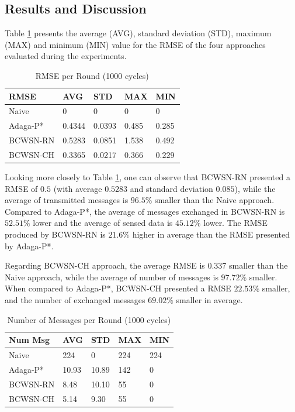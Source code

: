 \documentclass[conference]{IEEEtran}
\begin{document}
\subsection{Results and Discussion}
\label{results-and-discussion}


Table \ref{tab:rmse} presents the average (AVG), standard deviation (STD),
maximum (MAX) and minimum (MIN) value for the RMSE of the four approaches
evaluated during the experiments.

\begin{table}[h!]
\caption{RMSE per Round (1000 cycles)}
\label{tab:rmse}
\begin{center}
\begin{tabular}{|l||l|l|l|l|}
\hline
RMSE &AVG &STD &MAX &MIN \\
\hline\hline
Naive &0 &0 &0 &0 \\
\hline
Adaga-P* &0.4344 &0.0393 &0.485 &0.285 \\
\hline
BCWSN-RN &0.5283 &0.0851 &1.538 &0.492 \\
\hline
BCWSN-CH &0.3365 &0.0217 &0.366 &0.229 \\
\hline
\end{tabular}
\end{center}
\end{table}

Looking more closely to Table \ref{tab:rmse}, one can observe that BCWSN-RN
presented a RMSE of $0.5$ (with average $0.5283$ and standard deviation $0.085$),
while the average of transmitted messages  is $96.5\%$ smaller than the Naive
approach. Compared to Adaga-P*, the average of messages exchanged in BCWSN-RN is
 $52.51\%$ lower and the average of sensed data is $45.12\%$ lower. The RMSE
produced by BCWSN-RN is $21.6\%$ higher in average than the RMSE presented by
Adaga-P*.


Regarding BCWSN-CH approach, the average RMSE is $0.337$ smaller than the Naive
approach, while the average of number of messages is $97.72\%$ smaller. When
compared to Adaga-P*, BCWSN-CH presented a RMSE $22.53\%$ smaller, and the
number of exchanged messages $69.02\%$ smaller in average.

\begin{table}[h!]
\caption{Number of Messages per Round (1000 cycles)}
\label{tab:num-msg}
\begin{center}
\begin{tabular}{|l||l|l|l|l|}
\hline
Num Msg &AVG &STD &MAX &MIN \\
\hline\hline
Naive &224 &0 &224 &224 \\
\hline
Adaga-P* &10.93 &10.89 &142 &0 \\
\hline
BCWSN-RN &8.48 &10.10 &55 &0 \\
\hline
BCWSN-CH &5.14 &9.30 &55 &0 \\
\hline
\end{tabular}
\end{center}
\end{table}
\end{document}
